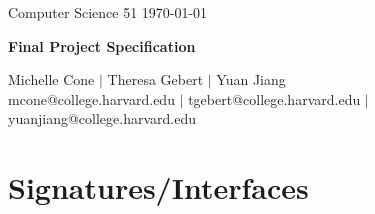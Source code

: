 \documentclass[11pt]{article}
\begin{document}
\doublespacing

\noindent Computer Science 51 \hfill \today\\
\noindent\makebox[\linewidth]{\rule{6.5in}{2.0pt}}

\begin{center}

{{\LARGE \bf Final Project Specification}} \\
\vspace{3mm}
{{\LARGE \bf }}

\noindent\makebox[\linewidth]{\rule{6.5in}{2.0pt}}

\vspace{3mm}

{\large Michelle Cone $|$ Theresa Gebert $|$ Yuan Jiang \\
\normalsize mcone@college.harvard.edu $|$ tgebert@college.harvard.edu $|$ yuanjiang@college.harvard.edu} \\

\end{center}


\vspace{2mm}

\section{Signatures/Interfaces}
\end{document}
